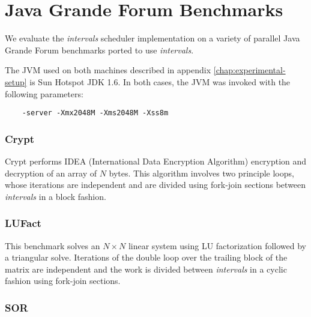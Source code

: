
\chapter{Java Grande Forum Benchmarks}
\label{chap:appendix-benchmarks}

We evaluate the \emph{intervals} scheduler implementation on a variety
of parallel Java Grande Forum benchmarks \cite{Smith2001, Mathew1999,
  Gregg2003} ported to use \emph{intervals}.


The JVM used on both machines described in appendix
\ref{chap:experimental-setup} is Sun Hotspot JDK 1.6. In both cases,
the JVM was invoked with the following parameters:

\begin{verbatim}
    -server -Xmx2048M -Xms2048M -Xss8m
\end{verbatim}


\subsection*{Crypt}

Crypt performs IDEA (International Data Encryption Algorithm)
encryption and decryption of an array of $N$ bytes. This algorithm
involves two principle loops, whose iterations are independent and are
divided using fork-join sections between \emph{intervals} in a block fashion.

\subsection*{LUFact}

This benchmark solves an $N \times N$ linear system using LU factorization
followed by a triangular solve. Iterations of the double loop over the
trailing block of the matrix are independent and the work is divided
between \emph{intervals} in a cyclic fashion using fork-join sections.

\subsection*{SOR}

